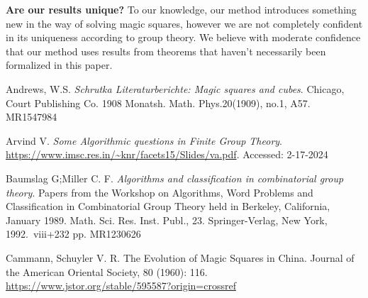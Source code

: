\documentclass{rhumj_new}
\begin{document}
\textbf{Are our results unique?} To our knowledge, our method introduces something new in the way
of solving magic squares, however we are not completely confident in its uniqueness according to
group theory. We believe with moderate confidence that our method uses results from theorems that
haven't necessarily been formalized in this paper.


\begin{thebibliography}{10}

  Andrews, W.S. {\it Schrutka
      Literaturberichte: Magic squares and cubes}.
  Chicago, Court Publishing Co. 1908
  Monatsh. Math. Phys.20(1909), no.1, A57.
  MR1547984

  Arvind V.
    {\it Some Algorithmic questions in Finite Group Theory}.
  \url{https://www.imsc.res.in/~knr/facets15/Slides/va.pdf}.
  Accessed: 2-17-2024

  Baumslag G;\@ Miller C. F.
    {\it Algorithms and classification in combinatorial group theory}.
  Papers from the Workshop on Algorithms, Word Problems and Classification in Combinatorial
  Group Theory held in Berkeley, California, January 1989.
  Math. Sci. Res. Inst. Publ., 23.
  Springer-Verlag, New York, 1992.\ viii+232 pp.
  MR1230626

  Cammann, Schuyler V. R.
    {The Evolution of Magic Squares in China}.
  Journal of the American Oriental Society, 80 (1960): 116.
  \url{https://www.jstor.org/stable/595587?origin=crossref}


\end{thebibliography}
\end{document}
